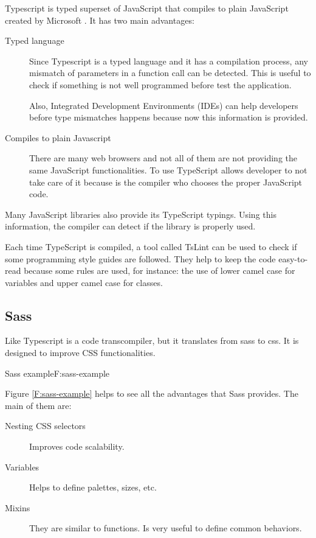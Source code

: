 Typescript is typed superset of JavaScript that compiles to plain JavaScript
created by Microsoft \cite{typescript-web}. It has two main advantages:

\begin{description}
	\item[Typed language]
	Since Typescript is a typed language and it has a compilation process, any
	mismatch of parameters in a function call can be detected. This is useful
	to check if something is not well programmed before test the application.
	
	Also, Integrated Development Environments (IDEs) can help developers before
	type mismatches happens because now this information is provided.
	
	\item[Compiles to plain Javascript]
	There are many web browsers and not all of them are not providing the same
	JavaScript functionalities. To use TypeScript allows developer to not take
	care of it because is the compiler who chooses the proper JavaScript code.

\end{description}

Many JavaScript libraries also provide its TypeScript typings. Using this 
information, the compiler can detect if the library is properly used.

Each time TypeScript is compiled, a tool called TsLint can be used to
check if some programming style guides are followed. They help to keep the code
easy-to-read because some rules are used, for instance: the use of lower camel 
case for variables and upper camel case for classes.

\subsection{Sass}

Like Typescript is a code transcompiler, but it translates from sass to css. It
is designed to improve CSS functionalities.

\begin{codefigure}{Sass example}{F:sass-example}
\end{codefigure}

Figure \ref{F:sass-example} helps to see all the advantages that Sass provides.
The main of them are:

\begin{description}
	\item[Nesting CSS selectors]
	Improves code scalability. 
	
	\item[Variables]
	Helps to define palettes, sizes, etc.
	
	\item[Mixins]
	They are similar to functions. Is very useful to define common behaviors.
	
\end{description}

